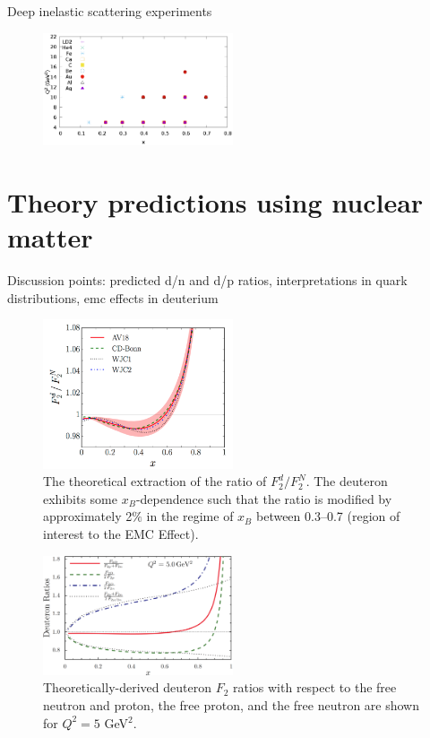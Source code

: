 \documentclass[oneside]{article}
\begin{document}
Deep inelastic scattering experiments 

\begin{figure}[H]
  \centering
      	  \includegraphics[width=0.5\textwidth]{plots/F2ADdataQ2vsx.eps}
 	 \caption[]{}
  \label{fig:slac_q2x}
 \end{figure} 
 
\section{Theory predictions using nuclear matter}

Discussion points: predicted d/n and d/p ratios, interpretations in quark distributions, emc effects in deuterium


  
\begin{figure}[H]
  \centering
      	  \includegraphics[width=0.5\textwidth]{plots/dn_effects_theory.png}
 	 \caption[Theoretical extraction of the ratio of $F_2^d/F_2^N$]{The theoretical extraction of the ratio of $F_2^d/F_2^N$. The deuteron exhibits some $x_B$-dependence such that the ratio is modified by approximately 2$\%$ in the regime of $x_B$ between 0.3--0.7 (region of interest to the EMC Effect).}
  \label{fig:dn_theory}
 \end{figure}  
 
\begin{figure}[H]
  \centering
      	  \includegraphics[width=0.5\textwidth]{plots/deut_ratio_theory.png}
 	 \caption[Theoretically-derived deuteron $F_2$ ratios with respect to the free nucleons]{Theoretically-derived deuteron $F_2$ ratios with respect to the free neutron and proton, the free proton, and the free neutron are shown for $Q^2=5$ GeV$^2$.}
  \label{fig:deut_theory}
 \end{figure}  
  
\end{document}
